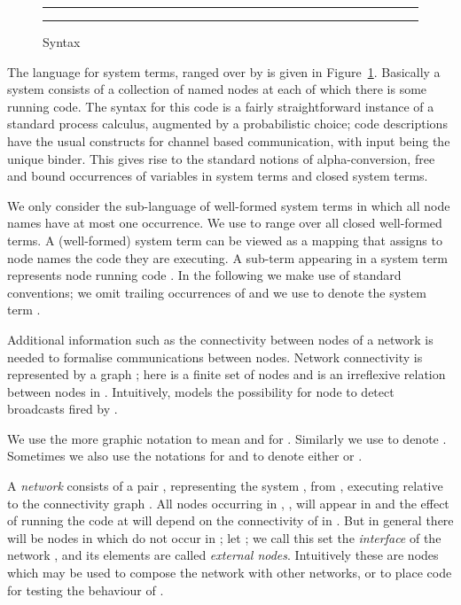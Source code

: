 \documentclass{LMCS}
\begin{document}
\begin{figure}[t]
\rule{\linewidth}{0.5mm}
  

  \caption{Syntax \label{fig:syntax}}
 \rule{\linewidth}{0.5mm} 
\end{figure}

\noindent The language for system terms, ranged over by  is given in
Figure~\ref{fig:syntax}.  Basically a system consists of a collection
of named nodes at each of which there is some running code.  The
syntax for this code is a fairly straightforward instance of a standard
process calculus, augmented by a probabilistic choice; code
descriptions have the usual constructs for channel based communication,
with input  being the unique binder. 
This gives rise to the standard notions of alpha-conversion, 
free and bound occurrences of variables in system terms and 
closed system terms.

We only consider the 
sub-language of well-formed system terms in which all node names have
at most one occurrence.  We use  to range over all closed
well-formed terms.  A (well-formed) system term can be viewed as a
mapping that assigns to node names the code they are executing. A
sub-term  appearing in a system term  represents node
 running code .
In the following we make use of standard conventions; we omit trailing 
occurrences of  and we use  to 
denote the system term .

Additional information such as the
connectivity between nodes of a network is needed to formalise
communications between nodes. 
Network connectivity is represented by a graph ; here  is a finite set of nodes
and  is an irreflexive relation 
between nodes in . 
Intuitively,  models the possibility for node  to detect 
broadcasts fired by .
 
We use the more graphic notation  to mean  and 
 for . 
Similarly we use  to denote
. 
Sometimes we also use the notations  for 
 and 
 to denote either  
or .

A \emph{network} consists of a pair ,
representing the system , from , executing relative to the connectivity graph
.  All nodes occurring in , , will appear in
 and the effect of  running  the code at 
will depend on the connectivity of  in .  But in general
there will be nodes in  which do not occur in ; let
;  we call this set 
 the \emph{interface}
of the network , and its elements are called \emph{external nodes}.  Intuitively
these are nodes which may be used to compose the network  with other networks, or to place code for testing the
behaviour of .  
\end{document}
